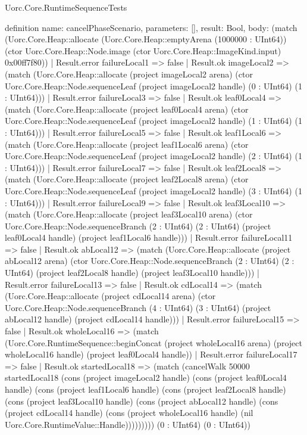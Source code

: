 \begin{lexlean}{Uorc.Core.RuntimeSequenceTests}
\begin{semanticmodule}
definition{
  name: cancelPhaseScenario,
  parameters: [],
  result: Bool,
  body: (match (Uorc.Core.Heap::allocate (Uorc.Core.Heap::emptyArena (1000000 : UInt64)) (ctor Uorc.Core.Heap::Node.image (ctor Uorc.Core.Heap::ImageKind.input) 0x00ff7f80))
    | Result.error failureLocal1 => false
    | Result.ok imageLocal2 => (match (Uorc.Core.Heap::allocate (project imageLocal2 arena) (ctor Uorc.Core.Heap::Node.sequenceLeaf (project imageLocal2 handle) (0 : UInt64) (1 : UInt64)))
      | Result.error failureLocal3 => false
      | Result.ok leaf0Local4 => (match (Uorc.Core.Heap::allocate (project leaf0Local4 arena) (ctor Uorc.Core.Heap::Node.sequenceLeaf (project imageLocal2 handle) (1 : UInt64) (1 : UInt64)))
        | Result.error failureLocal5 => false
        | Result.ok leaf1Local6 => (match (Uorc.Core.Heap::allocate (project leaf1Local6 arena) (ctor Uorc.Core.Heap::Node.sequenceLeaf (project imageLocal2 handle) (2 : UInt64) (1 : UInt64)))
          | Result.error failureLocal7 => false
          | Result.ok leaf2Local8 => (match (Uorc.Core.Heap::allocate (project leaf2Local8 arena) (ctor Uorc.Core.Heap::Node.sequenceLeaf (project imageLocal2 handle) (3 : UInt64) (1 : UInt64)))
            | Result.error failureLocal9 => false
            | Result.ok leaf3Local10 => (match (Uorc.Core.Heap::allocate (project leaf3Local10 arena) (ctor Uorc.Core.Heap::Node.sequenceBranch (2 : UInt64) (2 : UInt64) (project leaf0Local4 handle) (project leaf1Local6 handle)))
              | Result.error failureLocal11 => false
              | Result.ok abLocal12 => (match (Uorc.Core.Heap::allocate (project abLocal12 arena) (ctor Uorc.Core.Heap::Node.sequenceBranch (2 : UInt64) (2 : UInt64) (project leaf2Local8 handle) (project leaf3Local10 handle)))
                | Result.error failureLocal13 => false
                | Result.ok cdLocal14 => (match (Uorc.Core.Heap::allocate (project cdLocal14 arena) (ctor Uorc.Core.Heap::Node.sequenceBranch (4 : UInt64) (3 : UInt64) (project abLocal12 handle) (project cdLocal14 handle)))
                  | Result.error failureLocal15 => false
                  | Result.ok wholeLocal16 => (match (Uorc.Core.RuntimeSequence::beginConcat (project wholeLocal16 arena) (project wholeLocal16 handle) (project leaf0Local4 handle))
                    | Result.error failureLocal17 => false
                    | Result.ok startedLocal18 => (match (cancelWalk 50000 startedLocal18 (cons (project imageLocal2 handle) (cons (project leaf0Local4 handle) (cons (project leaf1Local6 handle) (cons (project leaf2Local8 handle) (cons (project leaf3Local10 handle) (cons (project abLocal12 handle) (cons (project cdLocal14 handle) (cons (project wholeLocal16 handle) (nil Uorc.Core.RuntimeValue::Handle))))))))) (0 : UInt64) (0 : UInt64))
}
\end{semanticmodule}
\end{lexlean}

